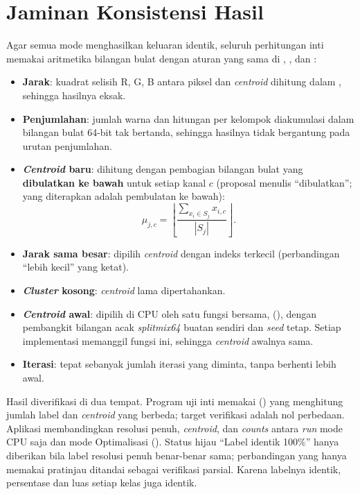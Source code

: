 \section{Jaminan Konsistensi Hasil}
\label{sec:konsistensi}
Agar semua mode menghasilkan keluaran identik, seluruh perhitungan inti memakai aritmetika bilangan bulat dengan aturan yang sama di , , dan :
\begin{itemize}
    \item \textbf{Jarak}: kuadrat selisih R, G, B antara piksel dan \emph{centroid} dihitung dalam , sehingga hasilnya eksak.
    \item \textbf{Penjumlahan}: jumlah warna dan hitungan per kelompok diakumulasi dalam bilangan bulat 64-bit tak bertanda, sehingga hasilnya tidak bergantung pada urutan penjumlahan.
    \item \textbf{\emph{Centroid} baru}: dihitung dengan pembagian bilangan bulat yang \textbf{dibulatkan ke bawah} untuk setiap kanal $c$ (proposal menulis ``dibulatkan''; yang diterapkan adalah pembulatan ke bawah):
    \begin{equation}
        \mu_{j,c} = \left\lfloor \frac{\sum_{x_i \in S_j} x_{i,c}}{|S_j|} \right\rfloor .
        \label{eq:floor}
    \end{equation}
    \item \textbf{Jarak sama besar}: dipilih \emph{centroid} dengan indeks terkecil (perbandingan ``lebih kecil'' yang ketat).
    \item \textbf{\emph{Cluster} kosong}: \emph{centroid} lama dipertahankan.
    \item \textbf{\emph{Centroid} awal}: dipilih di CPU oleh satu fungsi bersama,  (), dengan pembangkit bilangan acak \emph{splitmix64} buatan sendiri dan \emph{seed} tetap. Setiap implementasi memanggil fungsi ini, sehingga \emph{centroid} awalnya sama.
    \item \textbf{Iterasi}: tepat sebanyak jumlah iterasi yang diminta, tanpa berhenti lebih awal.
\end{itemize}

Hasil diverifikasi di dua tempat. Program uji inti memakai  () yang menghitung jumlah label dan \emph{centroid} yang berbeda; target verifikasi adalah nol perbedaan. Aplikasi membandingkan  resolusi penuh, \emph{centroid}, dan \emph{counts} antara \emph{run} mode CPU saja dan mode Optimalisasi (). Status hijau ``Label identik 100\%'' hanya diberikan bila label resolusi penuh benar-benar sama; perbandingan yang hanya memakai pratinjau ditandai sebagai verifikasi parsial. Karena labelnya identik, persentase dan luas setiap kelas juga identik.
